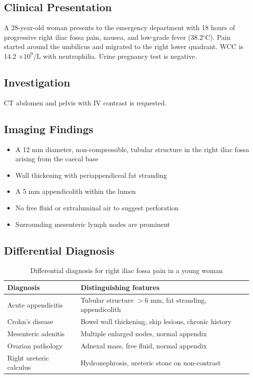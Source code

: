 \subsection{Clinical Presentation}
A 28-year-old woman presents to the emergency department with 18 hours of progressive right iliac fossa pain, nausea, and low-grade fever (38.2$^\circ$C). Pain started around the umbilicus and migrated to the right lower quadrant. WCC is 14.2 $\times 10^9$/L with neutrophilia. Urine pregnancy test is negative.

\subsection{Investigation}
CT abdomen and pelvis with IV contrast is requested.

\subsection{Imaging Findings}
\begin{itemize}
    \item A 12 mm diameter, non-compressible, tubular structure in the right iliac fossa arising from the caecal base
    \item Wall thickening with periappendiceal fat stranding
    \item A 5 mm appendicolith within the lumen
    \item No free fluid or extraluminal air to suggest perforation
    \item Surrounding mesenteric lymph nodes are prominent
\end{itemize}

\subsection{Differential Diagnosis}
\begin{table}[h]
\centering
\caption{Differential diagnosis for right iliac fossa pain in a young woman}
\begin{tabular}{|p{}|p{}|}
\hline
\textbf{Diagnosis} & \textbf{Distinguishing features} \\
\hline
Acute appendicitis & Tubular structure $>6$ mm, fat stranding, appendicolith \\
\hline
Crohn's disease & Bowel wall thickening, skip lesions, chronic history \\
\hline
Mesenteric adenitis & Multiple enlarged nodes, normal appendix \\
\hline
Ovarian pathology & Adnexal mass, free fluid, normal appendix \\
\hline
Right ureteric calculus & Hydronephrosis, ureteric stone on non-contrast \\
\hline
\end{tabular}
\end{table}


